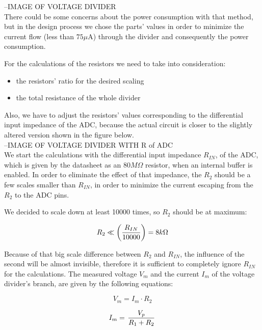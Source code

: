 --IMAGE OF VOLTAGE DIVIDER\\

There could be some concerns about the power consumption with that method, but in the design process we chose the parts’ values in order to minimize the current flow (less than $75\mu$A) through the divider and consequently the power consumption.

For the calculations of the resistors we need to take into consideration:

\begin{itemize}
    \item the resistors' ratio for the desired scaling
    \item the total resistance of the whole divider
\end{itemize}

Also, we have to adjust the resistors' values corresponding to the differential input impedance of the ADC, because the actual circuit is closer to the slightly altered version shown in the figure below.\\

--IMAGE OF VOLTAGE DIVIDER WITH R of ADC\\

We start the calculations with the differential input impedance $R_{IN}$, of the ADC, which is given by the datasheet as an $80M\Omega$ resistor, when an internal buffer is enabled. In order to eliminate the effect of that impedance, the $R_2$ should be a few scales smaller than $R_{IN}$, in order to minimize the current escaping from the $R_2$ to the ADC pins.

We decided to scale down at least 10000 times, so $R_2$ should be at maximum:

\begin{equation}
R_2 \ll \left( R_{IN} \over 10000 \right) = 8k\Omega
\label{eqn:maximum_R2}
\end{equation}

Because of that big scale difference between $R_2$ and $R_{IN}$, the influence of the second will be almost invisible, therefore it is sufficient to completely ignore $R_{IN}$ for the calculations. The measured voltage $V_m$ and the current $I_m$ of the voltage divider's branch, are given by the following equations:

\begin{equation}
V_m = I_m \cdot R_2
\label{eqn:Vm_general}
\end{equation}

\begin{equation}
I_m = \left. V_p \over R_1 + R_2 \right.
\label{eqn:Im_general}
\end{equation}


